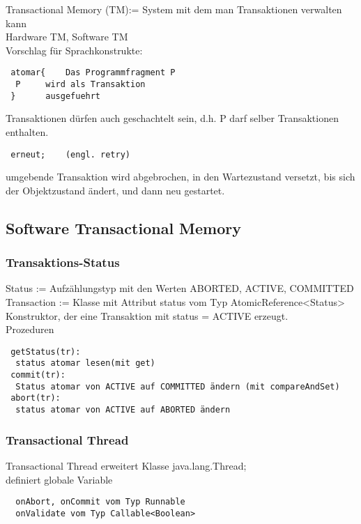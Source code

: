 \documentclass[a4paper,12pt]{scrartcl}
\begin{document}
Transactional Memory (TM):= System mit dem man Transaktionen verwalten kann\\
Hardware TM, Software TM\\
Vorschlag für Sprachkonstrukte:
\begin{lstlisting}
 atomar{	Das Programmfragment P
  P		wird als Transaktion
 }		ausgefuehrt
\end{lstlisting}

Transaktionen dürfen auch geschachtelt sein, d.h. P darf selber Transaktionen enthalten.\\
\begin{lstlisting}
 erneut; 	(engl. retry)
\end{lstlisting}
umgebende Transaktion wird abgebrochen, in den Wartezustand versetzt, bis sich der Objektzustand ändert, und dann neu gestartet.

\subsection{Software Transactional Memory}
\subsubsection{Transaktions-Status}
Status := Aufzählungstyp mit den Werten ABORTED, ACTIVE, COMMITTED\\
Transaction := Klasse mit Attribut status vom Typ AtomicReference<Status>\\
Konstruktor, der eine Transaktion mit status = ACTIVE erzeugt.\\
Prozeduren
\begin{lstlisting}
 getStatus(tr):
  status atomar lesen(mit get)
 commit(tr):
  Status atomar von ACTIVE auf COMMITTED ändern (mit compareAndSet)
 abort(tr):
  status atomar von ACTIVE auf ABORTED ändern
\end{lstlisting}

\subsubsection{Transactional Thread}

Transactional Thread erweitert Klasse java.lang.Thread;\\
definiert globale Variable
\begin{lstlisting}
  onAbort, onCommit vom Typ Runnable
  onValidate vom Typ Callable<Boolean>
\end{lstlisting}
\end{document}
